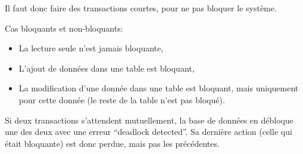 \documentclass[10pt,a4paper,french]{article}
\begin{document}
Il faut donc faire des transactions courtes, pour ne pas bloquer le système.

Cas bloquants et non-bloquants:
\begin{itemize}
\item La lecture seule n'est jamais bloquante,
\item L'ajout de données dans une table est bloquant, \hfill {}
\item La modification d'une donnée dans une table est bloquant, mais uniquement pour cette donnée (le reste de la table n'est pas bloqué). \hfill {}
\end{itemize}
Si deux transactions s'attendent mutuellement, la base de données en débloque une des deux avec une erreur ``deadlock detected''. Sa dernière action (celle qui était bloquante) est donc perdue, mais pas les précédentes.

\appendix %

\printglossaries
\end{document}
